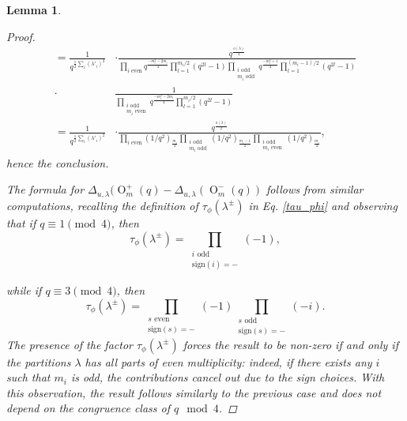 \documentclass[a4paper, 12pt, oneside]{amsart}
\newtheorem{lemma}[prop]{Lemma}
\theoremstyle{definition}
\DeclareMathOperator{\Or}{O}
\begin{document}
\begin{lemma}
\begin{proof}
{\begin{align*}
=\frac{1}{q^{\frac{1}{2}\sum_{i}(\lambda'_i)^2}}  &\cdot \frac{q^{\frac{o(\lambda)}{2}}}{\displaystyle\prod_{i \text{ even}}q^{\frac{-m_i^2-2m_i}{4}}\prod_{l=1}^{m_i/2}(q^{2l}-1)\prod_{\substack{i \text{ odd}\\m_i \text{ odd}}}q^{\frac{-m_i^2+1}{4}}\prod_{l=1}^{(m_i-1)/2}(q^{2l}-1)}\\ \cdot & \frac{1}{\displaystyle \prod_{\substack{i \text{ odd}\\m_i \text{ even}}}q^{\frac{-m_i^2-2m_i}{4}}\prod_{l=1}^{m_i/2}(q^{2l}-1)}\\
=\frac{1}{q^{\frac{1}{2}\sum_{i}(\lambda'_i)^2}}  &\cdot \frac{q^{\frac{o(\lambda)}{2}}}{\displaystyle\prod_{i \text{ even}} (1/q^2)_{\frac{m_i}{2}}\prod_{\substack{i \text{ odd}\\m_i \text{ odd}}}(1/q^2)_{\frac{m_i-1}{2}}\prod_{\substack{i \text{ odd}\\m_i \text{ even}}}(1/q^2)_{\frac{m_i}{2}}},
\end{align*}} 
hence the conclusion.

The formula for $\Delta_{u,\lambda}(\Or^{+}_m(q)-\Delta_{u,\lambda}(\Or^{-}_m(q))$ follows from similar computations, recalling the definition of $\tau_{\phi}(\lambda^{\pm})$ in Eq. \eqref{tau_phi} and observing that if $q \equiv 1 \pmod 4$, then $$\tau_{\phi}(\lambda^{\pm})=\prod_{\substack{i \text{ odd} \\ \text{sign}(i)=-}}(-1),$$

while if $q \equiv 3 \pmod 4$, then $$\tau_{\phi}(\lambda^{\pm})=\prod_{\substack{s \text{ even} \\ \text{sign}(s)=-}}(-1)\prod_{\substack{s \text{ odd} \\ \text{sign}(s)=-}}(-i).$$
The presence of the factor $\tau_{\phi}(\lambda^{\pm})$ forces the result to be non-zero if and only if the partitions $\lambda$ has all parts of even multiplicity: indeed, if there exists any $i$ such that $m_i$ is odd, the contributions cancel out due to the sign choices. With this observation, the result follows similarly to the previous case and does not depend on the congruence class of $q\mod 4$.
    \end{proof}
\end{lemma}
\end{document}
